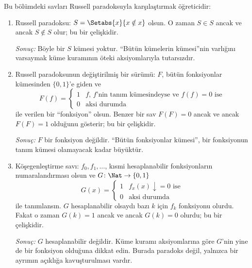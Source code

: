 \documentclass[../../../include/open-logic-section]{subfiles}
\begin{document}

Bu bölümdeki savları Russell paradoksuyla karşılaştırmak öğreticidir:
\begin{enumerate}
\item Russell paradoksu: $S=\Setabs{x}{x\notin x}$ olsun. O zaman
  $S\in S$ ancak ve ancak $S\notin S$ olur; bu bir çelişkidir.

  \emph{Sonuç:} Böyle bir $S$ kümesi yoktur. ``Bütün kümelerin kümesi''nin
  varlığını varsaymak küme kuramının öteki aksiyomlarıyla tutarsızdır.

\item Russell paradoksunun değiştirilmiş bir sürümü: $F$, bütün fonksiyonlar
  kümesinden $\{0,1\}$'e giden ve
  \[
    F(f)=\begin{cases}
      1 & \text{$f$, $f$'nin tanım kümesindeyse ve $f(f)=0$ ise}\\
      0 & \text{aksi durumda}
    \end{cases}
  \]
  ile verilen bir ``fonksiyon'' olsun. Benzer bir sav
  $F(F)=0$ ancak ve ancak $F(F)=1$ olduğunu gösterir; bu bir çelişkidir.

  \emph{Sonuç:} $F$ bir fonksiyon değildir. ``Bütün fonksiyonlar kümesi'',
  bir fonksiyonun tanım kümesi olamayacak kadar büyüktür.

\item Köşegenleştirme savı: $f_0,f_1,\dots$, kısmi hesaplanabilir
  fonksiyonların numaralandırması olsun ve $G\colon\Nat\to\{0,1\}$
  \[
    G(x)=\begin{cases}
      1 & \text{$f_x(x)\downarrow=0$ ise}\\
      0 & \text{aksi durumda}
    \end{cases}
  \]
  ile tanımlansın. $G$ hesaplanabilir olsaydı bazı $k$ için $f_k$ fonksiyonu
  olurdu. Fakat o zaman $G(k)=1$ ancak ve ancak $G(k)=0$ olurdu; bu bir
  çelişkidir.

  \emph{Sonuç:} $G$ hesaplanabilir değildir. Küme kuramı aksiyomlarına göre
  $G$'nin yine de bir fonksiyon olduğuna dikkat edin. Burada paradoks değil,
  yalnızca bir ayrımın açıklığa kavuşturulması vardır.
\end{enumerate}
\end{document}
